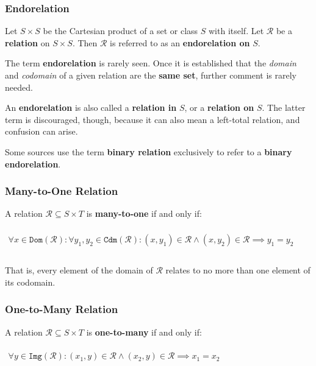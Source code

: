 \subsubsection{Endorelation}
\label{sec:endorelation}
Let $S \times S$ be the Cartesian product of a set or class $S$ with
itself. Let $\mathcal{R}$ be a \textbf{relation} on $S \times S$. Then
$\mathcal{R}$ is referred to as an \textbf{endorelation on} $S$.


The term \textbf{endorelation} is rarely seen. Once it is established
that the \textit{domain} and \textit{codomain} of a given relation are
the \textbf{same set}, further comment is rarely needed.


An \textbf{endorelation} is also called a \textbf{relation in} $S$, or
a \textbf{relation on} $S$. The latter term is discouraged, though,
because it can also mean a left-total relation, and confusion can
arise.

Some sources use the term \textbf{binary relation} exclusively to
refer to a \textbf{binary endorelation}.


\subsubsection{Many-to-One Relation}
\label{sec:many-to-one}

A relation $\mathcal{R} \subseteq S \times T$ is \textbf{many-to-one}
if and only if:

\begin{math}
  \begin{array}{c}
    \\
    \forall x \in \mathtt{Dom}(\mathcal{R}): \forall y_1, y_2 \in \mathtt{Cdm}(\mathcal{R}): (x, y_1) \in \mathcal{R} \land (x, y_2) \in \mathcal{R} \implies y_1 = y_2 \\
    \\
  \end{array}
\end{math}

That is, every element of the domain of $\mathcal{R}$ relates to no
more than one element of its codomain.

\subsubsection{One-to-Many Relation}
\label{sec:one-to-many}

A relation $\mathcal{R} \subseteq S \times T$ is \textbf{one-to-many}
if and only if:

\begin{math}
  \begin{array}{c}
    \\
    \forall y \in \mathtt{Img}(\mathcal{R}): (x_1, y) \in \mathcal{R} \land (x_2, y) \in \mathcal{R} \implies x_1 = x_2 \\
    \\
  \end{array}
\end{math}

